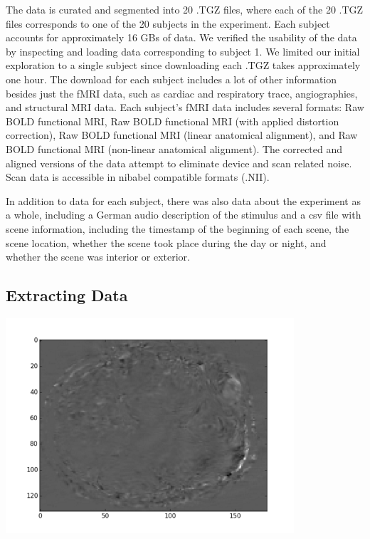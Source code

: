 The data is curated and segmented into 20 .TGZ files, where each of the 20
.TGZ  files corresponds to one of the 20 subjects in the experiment. Each
subject  accounts for approximately 16 GBs of data. We verified the usability
of the data by inspecting and loading data corresponding to subject 1. We
limited our initial exploration to a single subject since downloading each
.TGZ takes  approximately one hour.  The download for each subject includes a
lot of other information besides just the fMRI data, such as cardiac and
respiratory trace, angiographies, and structural MRI data. Each subject's fMRI
data includes several formats: Raw BOLD functional MRI, Raw BOLD functional
MRI (with applied distortion correction), Raw BOLD functional MRI (linear
anatomical alignment), and Raw BOLD functional MRI (non-linear anatomical
alignment). The corrected and aligned versions of the data attempt to
eliminate device and scan related noise. Scan data is accessible in nibabel
compatible formats (.NII).

In addition to data for each subject, there was also data about the
experiment as a whole, including a German audio description of the stimulus
and a csv file with scene information, including the timestamp of the
beginning of each scene, the scene location, whether the scene took place
during the day or night, and whether the scene was interior or exterior.  

\subsection{Extracting Data} 
\begin{center}                                                                  
\includegraphics[height=8cm]{1}                                                 
\end{center}                                                                    
                                                                                
